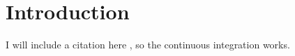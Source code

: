
\section{Introduction \label{sec:intro}}

I will include a citation here \cite{2014_mokhov_pg}, so the continuous integration works.

